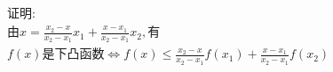 \documentclass[preview]{standalone}
\begin{document}
\begin{align*}
& \text{证明}: \\ & \text{由} x = \frac{x_2 - x}{x_2 - x_1}x_1 + \frac{x - x_1}{x_2 - x_1}x_2, \text{有} \\ & f(x) \text{是下凸函数} \Leftrightarrow  f(x) \leqslant \frac{x_2 - x}{x_2 - x_1}f(x_1) + \frac{x - x_1}{x_2 - x_1}f(x_2)\\
\end{align*}
\end{document}
